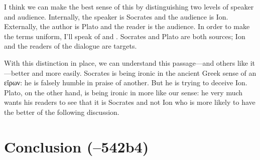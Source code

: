 \documentclass[11pt]{article}
\begin{document}
I think we can make the best sense of this by distinguishing two levels of
speaker and audience.  Internally, the speaker is Socrates and the audience
is Ion.  Externally, the author is Plato and the reader is the audience.
In order to make the terms uniform, I'll speak of  and
.  Socrates and Plato are both sources; Ion and the readers of
the dialogue are targets.

With this distinction in place, we can understand this passage---and others
like it---better and more easily.  Socrates is being ironic in the ancient
Greek sense of an {\g εἴρων}: he is falsely humble in praise of another.
But he is trying to deceive Ion.  Plato, on the other hand, is being ironic
in more like our sense: he very much wants his readers to see that it is
Socrates and not Ion who is more likely to have the better of the following
discussion.


\section{Conclusion (--542b4)}


\newpage


\end{document}
